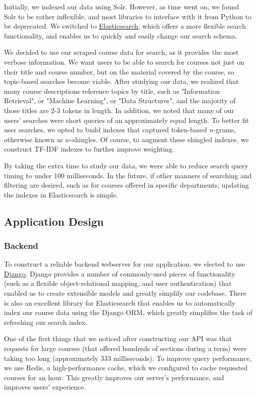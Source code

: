 \documentclass{article}
\begin{document}
Initially, we indexed our data using Solr. However, as time went on, we found Solr to be rather inflexible, and most libraries to interface with it from Python to be deprecated. We switched to \href{https://www.elastic.co/}{Elasticsearch}, which offers a more flexible search functionality, and enables us to quickly and easily change our search schema.

We decided to use our scraped course data for search, as it provides the most verbose information. We want users to be able to search for courses not just on their title and course number, but on the material covered by the course, so topic-based searches become viable. After studying our data, we realized that many course descriptions reference topics by title, such as "Information Retrieval", or "Machine Learning", or "Data Structures", and the majority of those titles are 2-3 tokens in length. In addition, we noted that many of our users' searches were short queries of an approximately equal length. To better fit user searches, we opted to build indexes that captured token-based $n$-grams, otherwise known as $w$-shingles. Of course, to augment these shingled indexes, we construct TF-IDF indexes to further improve weighting.

By taking the extra time to study our data, we were able to reduce search query timing to under 100 milliseconds. In the future, if other manners of searching and filtering are desired, such as for courses offered in specific departments, updating the indexes in Elasticsearch is simple.

\subsection{Application Design}
\subsubsection{Backend}
To construct a reliable backend webserver for our application, we elected to use \href{https://www.djangoproject.com/}{Django}. Django provides a number of commonly-used pieces of functionality (such as a flexible object-relational mapping, and user authentication) that enabled us to create extensible models  and greatly simplify our codebase. There is also an excellent library for Elasticsearch that enables us to automatically index our course data using the Django ORM, which greatly simplifies the task of refreshing our search index.

One of the first things that we noticed after constructing our API was that requests for large courses (that offered hundreds of sections during a term) were taking too long (approximately 333 milliseconds). To improve query performance, we use Redis, a high-performance cache, which we configured to cache requested courses for an hour. This greatly improves our server's performance, and improves users' experience.
\end{document}
